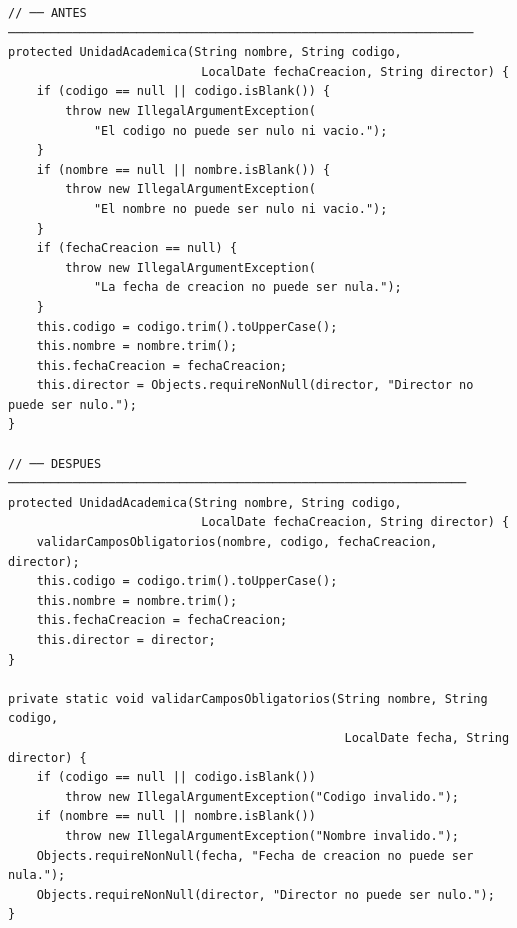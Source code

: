 \begin{lstlisting}[style=javaStyle,
  caption={\textit{Extract Method} en \java: antes y después.},
  label={lst:refact-extract-java}]
// ── ANTES ─────────────────────────────────────────────────────────────────
protected UnidadAcademica(String nombre, String codigo,
                           LocalDate fechaCreacion, String director) {
    if (codigo == null || codigo.isBlank()) {
        throw new IllegalArgumentException(
            "El codigo no puede ser nulo ni vacio.");
    }
    if (nombre == null || nombre.isBlank()) {
        throw new IllegalArgumentException(
            "El nombre no puede ser nulo ni vacio.");
    }
    if (fechaCreacion == null) {
        throw new IllegalArgumentException(
            "La fecha de creacion no puede ser nula.");
    }
    this.codigo = codigo.trim().toUpperCase();
    this.nombre = nombre.trim();
    this.fechaCreacion = fechaCreacion;
    this.director = Objects.requireNonNull(director, "Director no puede ser nulo.");
}

// ── DESPUES ────────────────────────────────────────────────────────────────
protected UnidadAcademica(String nombre, String codigo,
                           LocalDate fechaCreacion, String director) {
    validarCamposObligatorios(nombre, codigo, fechaCreacion, director);
    this.codigo = codigo.trim().toUpperCase();
    this.nombre = nombre.trim();
    this.fechaCreacion = fechaCreacion;
    this.director = director;
}

private static void validarCamposObligatorios(String nombre, String codigo,
                                               LocalDate fecha, String director) {
    if (codigo == null || codigo.isBlank())
        throw new IllegalArgumentException("Codigo invalido.");
    if (nombre == null || nombre.isBlank())
        throw new IllegalArgumentException("Nombre invalido.");
    Objects.requireNonNull(fecha, "Fecha de creacion no puede ser nula.");
    Objects.requireNonNull(director, "Director no puede ser nulo.");
}
\end{lstlisting}

